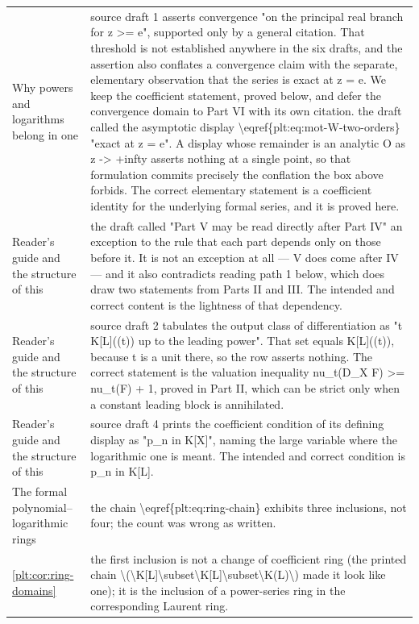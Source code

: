 \documentclass[11pt,oneside]{article}
\theoremstyle{plain}
\theoremstyle{definition}
\theoremstyle{remark}
\begin{document}
\begin{longtable}{@{}p{} p{}@{}}
Why powers and logarithms belong in one  & source draft 1 asserts convergence "on the principal real branch for z >= e", supported only by a general citation. That threshold is not established anywhere in the six drafts, and the assertion also conflates a convergence claim with the separate, elementary observation that the series is exact at z = e. We keep the coefficient statement, proved below, and defer the convergence domain to Part VI with its own citation. the draft called the asymptotic display \textbackslash eqref\{plt:eq:mot-W-two-orders\} "exact at z = e". A display whose remainder is an analytic O as z -> +infty asserts nothing at a single point, so that formulation commits precisely the conflation the box above forbids. The correct elementary statement is a coefficient identity for the underlying formal series, and it is proved here.\\
Reader's guide and the structure of this & the draft called "Part V may be read directly after Part IV" an exception to the rule that each part depends only on those before it. It is not an exception at all --- V does come after IV --- and it also contradicts reading path 1 below, which does draw two statements from Parts II and III. The intended and correct content is the lightness of that dependency.\\
Reader's guide and the structure of this & source draft 2 tabulates the output class of differentiation as "t K[L]((t)) up to the leading power". That set equals K[L]((t)), because t is a unit there, so the row asserts nothing. The correct statement is the valuation inequality nu\_t(D\_X F) >= nu\_t(F) + 1, proved in Part II, which can be strict only when a constant leading block is annihilated.\\
Reader's guide and the structure of this & source draft 4 prints the coefficient condition of its defining display as "p\_n in K[X]", naming the large variable where the logarithmic one is meant. The intended and correct condition is p\_n in K[L].\\
The formal polynomial--logarithmic rings & the chain \textbackslash eqref\{plt:eq:ring-chain\} exhibits three inclusions, not four; the count was wrong as written.\\
\cref{plt:cor:ring-domains} & the first inclusion is not a change of coefficient ring (the printed chain \textbackslash (\textbackslash K[L]\textbackslash subset\textbackslash K[L]\textbackslash subset\textbackslash K(L)\textbackslash ) made it look like one); it is the inclusion of a power-series ring in the corresponding Laurent ring.\\

\end{longtable}
\end{document}
